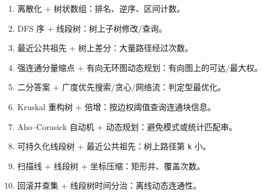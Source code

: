 \begin{enumerate}
\def\labelenumi{\arabic{enumi}.}
\tightlist
\item
  离散化 + 树状数组：排名、逆序、区间计数。
\item
  DFS 序 + 线段树：树上子树修改/查询。
\item
  最近公共祖先 + 树上差分：大量路径经过次数。
\item
  强连通分量缩点 + 有向无环图动态规划：有向图上的可达/最大权。
\item
  二分答案 + 广度优先搜索/贪心/网络流：判定型最优化。
\item
  Kruskal 重构树 + 倍增：按边权阈值查询连通块信息。
\item
  Aho--Corasick 自动机 + 动态规划：避免模式或统计匹配串。
\item
  可持久化线段树 + 最近公共祖先：树上路径第 \passthrough{\lstinline!k!} 小。
\item
  扫描线 + 线段树 + 坐标压缩：矩形并、覆盖次数。
\item
  回滚并查集 + 线段树时间分治：离线动态连通性。
\end{enumerate}

